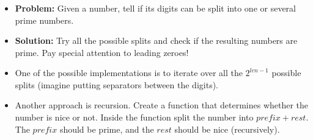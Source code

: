 \begin{frame}
    \frametitle{\problemtitle}
    \begin{itemize}
        \item<+-> \textbf{Problem:} Given a number, tell if its digits can be split into one or several prime numbers.
        \item<+-> \textbf{Solution:} Try all the possible splits and check if the resulting numbers are prime. Pay special attention to leading zeroes! 
        \item<+-> One of the possible implementations is to iterate over all the $2^{len-1}$ possible splits (imagine putting separators between the digits).
        \item<+-> Another approach is recursion. Create a function that determines whether the number is nice or not. Inside the function split the number into $prefix+rest$. The $prefix$ should be prime, and the $rest$ should be nice (recursively).
    \end{itemize}
\end{frame}
